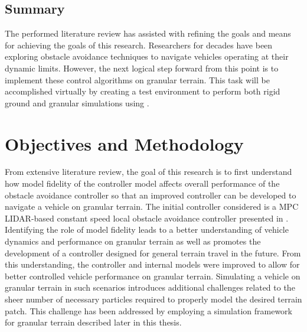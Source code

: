 \documentclass[12pt,onecolumn]{report}
\newcommand{\CHRONO}{{\sffamily{{Chrono}}}}
\begin{document}
\subsection{Summary}\label{ss:LitSummary}

The performed literature review has assisted with refining the goals and means for achieving the goals of this research. Researchers for decades have been exploring obstacle avoidance techniques to navigate vehicles operating at their dynamic limits. However, the next logical step forward from this point is to implement these control algorithms on granular terrain. This task will be accomplished virtually by creating a test environment to perform both rigid ground and granular simulations using {\CHRONO}. 


\section{Objectives and Methodology}\label{s:ObjectivesMethodology}

From extensive literature review, the goal of this research is to first understand how model fidelity of the controller model affects overall performance of the obstacle avoidance controller so that an improved controller can be developed to navigate a vehicle on granular terrain. The initial controller considered is a MPC LIDAR-based constant speed local obstacle avoidance controller presented in \cite{ModelFidelity2016}. Identifying the role of model fidelity leads to a better understanding of vehicle dynamics and performance on granular terrain as well as promotes the development of a controller designed for general terrain travel in the future. From this understanding, the controller and internal models were improved to allow for better controlled vehicle performance on granular terrain. Simulating a vehicle on granular terrain in such scenarios introduces additional challenges related to the sheer number of necessary particles required to properly model the desired terrain patch. This challenge has been addressed by employing a simulation framework for granular terrain described later in this thesis.
\end{document}
